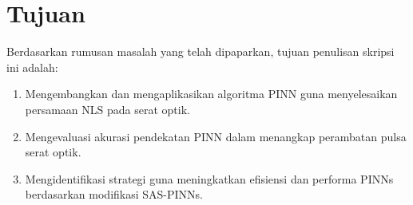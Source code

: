 \section{Tujuan}
Berdasarkan rumusan masalah yang telah dipaparkan, tujuan penulisan skripsi ini adalah:
\begin{enumerate}
	\item Mengembangkan dan mengaplikasikan algoritma PINN guna menyelesaikan persamaan NLS pada serat optik.
    \item Mengevaluasi akurasi pendekatan PINN dalam menangkap perambatan pulsa serat optik.
	\item Mengidentifikasi strategi guna meningkatkan efisiensi dan performa PINNs berdasarkan modifikasi SAS-PINNs.
\end{enumerate}